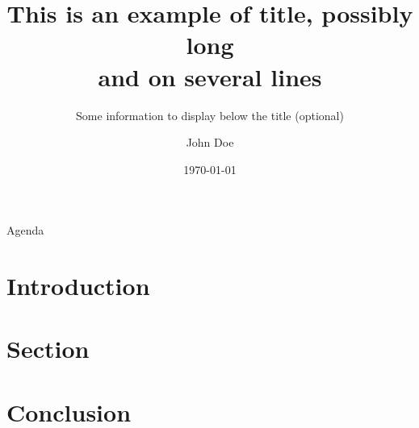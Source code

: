 \documentclass{include/slides}
\title[The shorter version of the title]{
	This is an example of title, possibly long \\
	and on several lines
}
\subtitle{Some information to display below the title (optional)}
\author[J.\ Doe]{John Doe}
\date[\today]{\today}
\affiliation[Short affiliation]{
	The full affiliation \\[1pt]
	University of Awesome City
}
\begin{document}
\maketitle

\begin{frame}{Agenda}
	\tableofcontents
\end{frame}

\section{Introduction}

\begin{frame}{\secname}
	
\end{frame}

\section{Section}

\begin{frame}{\secname}
	
\end{frame}

\section{Conclusion}

\begin{frame}{\secname}
	
\end{frame}
\end{document}
